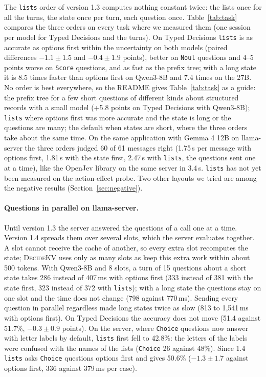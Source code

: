\documentclass[11pt]{article}
\newcommand{\dkv}{\textsc{DecideKV}}
\begin{document}
The \texttt{lists} order of version 1.3 computes nothing constant twice: the lists once for all the turns, the state
once per turn, each question once. Table~\ref{tab:task} compares the three orders on every task where we measured them
(one session per model for Typed Decisions and the turns). On Typed Decisions \texttt{lists} is as accurate as options
first within the uncertainty on both models (paired differences $-1.1\pm1.5$ and $-0.4\pm1.9$ points), better on
\texttt{Noul} questions and 4--5 points worse on \texttt{Score} questions, and as fast as the prefix tree; with a long
state it is 8.5 times faster than options first on Qwen3-8B and 7.4 times on the 27B. No order is best everywhere, so
the README gives Table~\ref{tab:task} as a guide: the prefix tree for a few short questions of different kinds about
structured records with a small model (+5.8 points on Typed Decisions with Qwen3-8B); \texttt{lists} where options first
was more accurate and the state is long or the questions are many; the default when states are short, where the three
orders take about the same time. On the same application with Gemma 4 12B on llama-server the three orders judged 60
of 61 messages right (1.75\,s per message with options first, 1.81\,s with the state first, 2.47\,s with \texttt{lists},
the questions sent one at a time), like the OpenJev library on the same server in 3.4\,s. \texttt{lists} has not yet
been measured on the action-effect probe. Two other layouts we tried are among the negative results
(Section~\ref{sec:negative}).

\paragraph{Questions in parallel on llama-server.} Until version 1.3 the server answered the questions of a call one
at a time. Version 1.4 spreads them over several slots, which the server evaluates together. A slot cannot receive
the cache of another, so every extra slot recomputes the state; \dkv{} uses only as many slots as keep this extra work
within about 500 tokens. With Qwen3-8B and 8 slots, a turn of 15 questions about a short state takes 286 instead of
407\,ms with options first (333 instead of 381 with the state first, 323 instead of 372 with \texttt{lists}); with a
long state the questions stay on one slot and the time does not change (798 against 770\,ms). Sending every question in
parallel regardless made long states twice as slow (813 to 1{,}541\,ms with options first). On Typed Decisions the
accuracy does not move (51.4 against 51.7\%, $-0.3\pm0.9$ points). On the server, where \texttt{Choice} questions now
answer with letter labels by default, \texttt{lists} first fell to 42.8\%: the letters of the labels were confused with
the names of the lists (\texttt{Choice} 26 against 48\%). Since 1.4 \texttt{lists} asks \texttt{Choice} questions options
first and gives 50.6\% ($-1.3\pm1.7$ against options first, 336 against 379\,ms per case).
\end{document}
